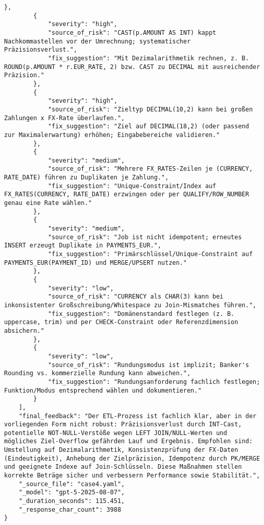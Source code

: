 \begin{lstlisting}[caption={Ausgabe: GPT-5 Anwendungsfall 4 Konsistenzdurchlauf},label={gpt_case4_prompt2}]
        },
        {
            "severity": "high",
            "source_of_risk": "CAST(p.AMOUNT AS INT) kappt Nachkommastellen vor der Umrechnung; systematischer Präzisionsverlust.",
            "fix_suggestion": "Mit Dezimalarithmetik rechnen, z. B. ROUND(p.AMOUNT * r.EUR_RATE, 2) bzw. CAST zu DECIMAL mit ausreichender Präzision."
        },
        {
            "severity": "high",
            "source_of_risk": "Zieltyp DECIMAL(10,2) kann bei großen Zahlungen x FX-Rate überlaufen.",
            "fix_suggestion": "Ziel auf DECIMAL(18,2) (oder passend zur Maximalerwartung) erhöhen; Eingabebereiche validieren."
        },
        {
            "severity": "medium",
            "source_of_risk": "Mehrere FX_RATES-Zeilen je (CURRENCY, RATE_DATE) führen zu Duplikaten je Zahlung.",
            "fix_suggestion": "Unique-Constraint/Index auf FX_RATES(CURRENCY, RATE_DATE) erzwingen oder per QUALIFY/ROW_NUMBER genau eine Rate wählen."
        },
        {
            "severity": "medium",
            "source_of_risk": "Job ist nicht idempotent; erneutes INSERT erzeugt Duplikate in PAYMENTS_EUR.",
            "fix_suggestion": "Primärschlüssel/Unique-Constraint auf PAYMENTS_EUR(PAYMENT_ID) und MERGE/UPSERT nutzen."
        },
        {
            "severity": "low",
            "source_of_risk": "CURRENCY als CHAR(3) kann bei inkonsistenter Großschreibung/Whitespace zu Join-Mismatches führen.",
            "fix_suggestion": "Domänenstandard festlegen (z. B. uppercase, trim) und per CHECK-Constraint oder Referenzdimension absichern."
        },
        {
            "severity": "low",
            "source_of_risk": "Rundungsmodus ist implizit; Banker's Rounding vs. kommerzielle Rundung kann abweichen.",
            "fix_suggestion": "Rundungsanforderung fachlich festlegen; Funktion/Modus entsprechend wählen und dokumentieren."
        }
    ],
    "final_feedback": "Der ETL-Prozess ist fachlich klar, aber in der vorliegenden Form nicht robust: Präzisionsverlust durch INT-Cast, potentielle NOT-NULL-Verstöße wegen LEFT JOIN/NULL-Werten und mögliches Ziel-Overflow gefährden Lauf und Ergebnis. Empfohlen sind: Umstellung auf Dezimalarithmetik, Konsistenzprüfung der FX-Daten (Eindeutigkeit), Anhebung der Zielpräzision, Idempotenz durch PK/MERGE und geeignete Indexe auf Join-Schlüsseln. Diese Maßnahmen stellen korrekte Beträge sicher und verbessern Performance sowie Stabilität.",
    "_source_file": "case4.yaml",
    "_model": "gpt-5-2025-08-07",
    "_duration_seconds": 115.451,
    "_response_char_count": 3988
}
\end{lstlisting}

